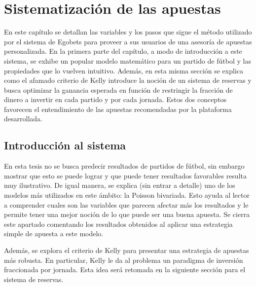 \graphicspath{{/Users/brunomedina/Dropbox/Tesis-Egobets/egobets-notas/resources/}}

\chapter{Sistematización de las apuestas}
\label{chap:mate}


En este capítulo se detallan las variables y los pasos que sigue el método utilizado por el sistema de Egobets para proveer a sus usuarios de una asesoría de apuestas personalizada. En la primera parte del capítulo, a modo de introducción a este sistema, se exhibe un popular modelo matemático para un partido de fútbol y las propiedades que lo vuelven intuitivo. Además, en esta misma sección se explica como el afamado criterio de Kelly introduce la noción de un sistema de reservas y busca optimizar la ganancia esperada en función de restringir la fracción de dinero a invertir en cada partido y por cada jornada. Estos dos conceptos favorecen el entendimiento de las apuestas recomendadas por la plataforma desarrollada.

\section{Introducción al sistema}
\label{sec:evidencia}

En esta tesis no se busca predecir resultados de partidos de fútbol, sin embargo mostrar que esto se puede lograr y que puede tener resultados favorables resulta muy ilustrativo. De igual manera, se explica (sin entrar a detalle) uno de los modelos más utilizados en este ámbito: la Poisson bivariada. Esto ayuda al lector a comprender cuales son las variables que parecen afectar más los resultados y le permite tener una mejor noción de lo que puede ser una buena apuesta. Se cierra este apartado comentando los resultados obtenidos al aplicar una estrategia simple de apuesta a este modelo.

Además, se explora el criterio de Kelly para presentar una estrategia de apuestas más robusta. En particular, Kelly le da al problema un paradigma de inversión fraccionada por jornada. Esta idea será retomada en la siguiente sección para el sistema de reservas.

